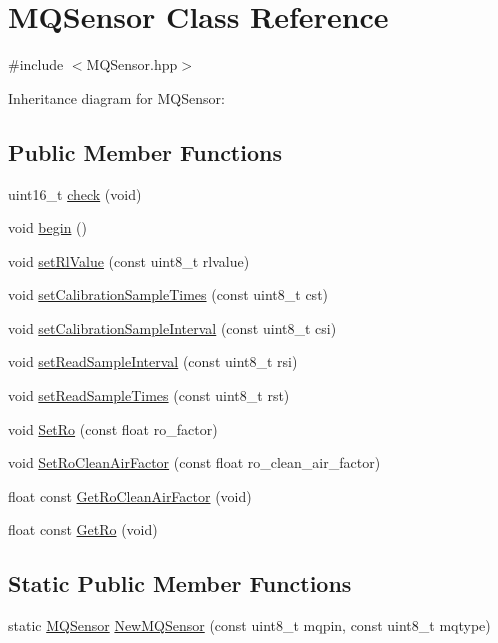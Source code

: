 \hypertarget{class_m_q_sensor}{}\section{M\+Q\+Sensor Class Reference}
\label{class_m_q_sensor}


{\ttfamily \#include $<$M\+Q\+Sensor.\+hpp$>$}



Inheritance diagram for M\+Q\+Sensor\+:
\subsection*{Public Member Functions}
\begin{DoxyCompactItemize}
\item 
uint16\+\_\+t \hyperlink{class_m_q_sensor_acc2b495b544c2e801a4708c91df7a874}{check} (void)
\item 
void \hyperlink{class_m_q_sensor_ae6d1b0181e6769745caf5766ceef1522}{begin} ()
\item 
void \hyperlink{class_m_q_sensor_a54d01cd9465f177f431f070f7e96821d}{set\+Rl\+Value} (const uint8\+\_\+t rlvalue)
\item 
void \hyperlink{class_m_q_sensor_ad93e118f8bce230241af72307a7c2b79}{set\+Calibration\+Sample\+Times} (const uint8\+\_\+t cst)
\item 
void \hyperlink{class_m_q_sensor_ad14ad2558241aac29113e13b8a5137f7}{set\+Calibration\+Sample\+Interval} (const uint8\+\_\+t csi)
\item 
void \hyperlink{class_m_q_sensor_acefcf4fca770e50814f32bac2c80459c}{set\+Read\+Sample\+Interval} (const uint8\+\_\+t rsi)
\item 
void \hyperlink{class_m_q_sensor_a8e4a65e66a55f8abbe4365400e27ab97}{set\+Read\+Sample\+Times} (const uint8\+\_\+t rst)
\item 
void \hyperlink{class_m_q_sensor_a03eb97a82d462ee54ed249bc11da916a}{Set\+Ro} (const float ro\+\_\+factor)
\item 
void \hyperlink{class_m_q_sensor_a870f6dacc4896cdea8cb114b3b508ea3}{Set\+Ro\+Clean\+Air\+Factor} (const float ro\+\_\+clean\+\_\+air\+\_\+factor)
\item 
float const \hyperlink{class_m_q_sensor_a48389f7f5b5757092f7ae7a0893fe33f}{Get\+Ro\+Clean\+Air\+Factor} (void)
\item 
float const \hyperlink{class_m_q_sensor_a7292dbbdb30f7dac813f16009b6cd282}{Get\+Ro} (void)
\end{DoxyCompactItemize}
\subsection*{Static Public Member Functions}
\begin{DoxyCompactItemize}
\item 
static \hyperlink{class_m_q_sensor}{M\+Q\+Sensor} \hyperlink{class_m_q_sensor_a7f29aed48ad89d8403f08a4e83b136b5}{New\+M\+Q\+Sensor} (const uint8\+\_\+t mqpin, const uint8\+\_\+t mqtype)
\end{DoxyCompactItemize}
